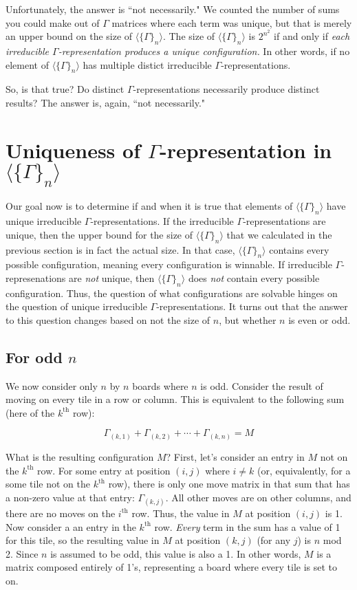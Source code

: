 \documentclass{article}[12pt]
\newcommand{\supt}[1]{^{\text{#1}}}
\newcommand{\gen}[2]{\Gamma_{(#1,#2)}}
\newcommand{\subgroup}[1]{\langle\{\Gamma\}_{#1}\rangle}
\begin{document}
Unfortunately, the answer is ``not necessarily."  We counted the number of sums you could make out of $\Gamma$ matrices where each term was unique, but that is merely an upper bound on the size of $\subgroup{n}$.  The size of $\subgroup{n}$ is $2^{n^2}$ if and only if \emph{each irreducible $\Gamma$-representation produces a unique configuration.}  In other words, if no element of $\subgroup{n}$ has multiple distict irreducible $\Gamma$-representations.

So, is that true?  Do distinct $\Gamma$-representations necessarily produce distinct results?  The answer is, again, ``not necessarily."

\section{Uniqueness of $\Gamma$-representation in $\subgroup{n}$}

Our goal now is to determine if and when it is true that elements of $\subgroup{n}$ have unique irreducible $\Gamma$-representations.  If the irreducible $\Gamma$-representations are unique, then the upper bound for the size of $\subgroup{n}$ that we calculated in the previous section is in fact the actual size.  In that case, $\subgroup{n}$ contains every possible configuration, meaning every configuration is winnable.  If irreducible $\Gamma$-represenations are \emph{not} unique, then $\subgroup{n}$ does \emph{not} contain every possible configuration.  Thus, the question of what configurations are solvable hinges on the question of unique irreducible $\Gamma$-representations.  It turns out that the answer to this question changes based on not the size of $n$, but whether $n$ is even or odd.

\subsection{For odd $n$}

We now consider only $n$ by $n$ boards where $n$ is odd.  Consider the result of moving on every tile in a row or column.  This is equivalent to the following sum (here of the $k\supt{th}$ row):

\begin{equation}
\label{sum_row}
\gen{k}{1} + \gen{k}{2} + \cdots + \gen{k}{n} = M
\end{equation}

What is the resulting configuration $M$?    First, let's consider an entry in $M$ not on the $k\supt{th}$ row.  For some entry at position $(i,j)$ where $i \neq k$ (or, equivalently, for a some tile not on the $k\supt{th}$ row), there is only one move matrix in that sum that has a non-zero value at that entry: $\gen{k}{j}$.  All other moves are on other columns, and there are no moves on the $i\supt{th}$ row.  Thus, the value in $M$ at position $(i,j)$ is 1.  Now consider a an entry in the $k\supt{th}$ row.  \emph{Every} term in the sum has a value of 1 for this tile, so the resulting value in $M$ at position $(k,j)$ (for any $j$) is $n$ mod 2.  Since $n$ is assumed to be odd, this value is also a 1.  In other words, $M$ is a matrix composed entirely of 1's, representing a board where every tile is set to on.
\end{document}
